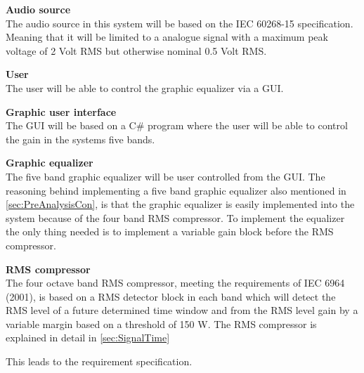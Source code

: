 \textbf{Audio source} \\
The audio source in this system will be based on the IEC 60268-15 specification. Meaning that it will be limited to a analogue signal with a maximum peak voltage of 2 Volt RMS but otherwise nominal 0.5 Volt RMS. %

\textbf{User} \\
The user will be able to control the graphic equalizer via a GUI. 

\textbf{Graphic user interface}\\
The GUI will be based on a C\# program where the user will be able to control the gain in the systems five bands.

\textbf{Graphic equalizer}\\
The five band graphic equalizer will be user controlled from the GUI. The reasoning behind implementing a five band graphic equalizer also mentioned in \autoref{sec:PreAnalysisCon}, is that the graphic equalizer is easily implemented into the system because of the four band RMS compressor. To implement the equalizer the only thing needed is to implement a variable gain block before the RMS compressor.

\textbf{RMS compressor}\\
The four octave band RMS compressor, meeting the requirements of IEC 6964 (2001), is based on a RMS detector block in each band which will detect the RMS level of a future determined time window and from the RMS level gain by a variable margin based on a threshold of 150 W. The RMS compressor is explained in detail in \autoref{sec:SignalTime}  

This leads to the requirement specification. 














